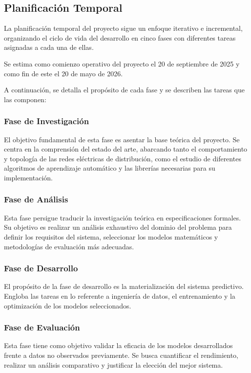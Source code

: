 \subsection{Planificación Temporal}
La planificación temporal del proyecto sigue un enfoque iterativo e incremental, organizando el ciclo de vida del desarrollo en cinco fases con diferentes tareas asignadas a cada una de ellas. 

Se estima como comienzo operativo del proyecto el 20 de septiembre de 2025 y como fin de este el 20 de mayo de 2026.

A continuación, se detalla el propósito de cada fase y se describen las tareas que las componen:

\subsubsection{Fase de Investigación}
El objetivo fundamental de esta fase es asentar la base teórica del proyecto. Se centra en la comprensión del estado del arte, abarcando tanto el comportamiento y topología de las redes eléctricas de distribución, como el estudio de diferentes algoritmos de aprendizaje automático y las librerías necesarias para su implementación.


\clearpage

\subsubsection{Fase de Análisis}
Esta fase persigue traducir la investigación teórica en especificaciones formales. Su objetivo es realizar un análisis exhaustivo del dominio del problema para definir los requisitos del sistema, seleccionar los modelos matemáticos y metodologías de evaluación más adecuadas.


\clearpage

\subsubsection{Fase de Desarrollo}
El propósito de la fase de desarrollo es la materialización del sistema predictivo. Engloba las tareas en lo referente a ingeniería de datos, el entrenamiento y la optimización de los modelos seleccionados.


\clearpage

\subsubsection{Fase de Evaluación}
Esta fase tiene como objetivo validar la eficacia de los modelos desarrollados frente a datos no observados previamente. Se busca cuantificar el rendimiento, realizar un análisis comparativo y justificar la elección del mejor sistema.

